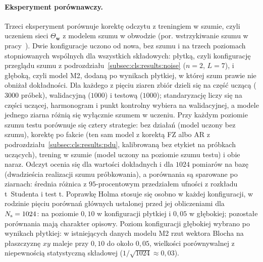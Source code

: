 \paragraph{Eksperyment porównawczy.}
Trzeci eksperyment porównuje korektę odczytu z treningiem w szumie, czyli uczeniem sieci $\Theta_{\mathbf{w}}$ z modelem szumu w obwodzie (por. wstrzykiwanie szumu w pracy~\cite{wang_quantumnat_2022}).
Dwie konfiguracje uczono od nowa, bez szumu i na trzech poziomach stopniowanych wspólnych dla wszystkich składowych: płytką, czyli konfigurację przeglądu szumu z podrozdziału~\ref{subsec:cls:results:noise} ($n=2$, $L=7$), i głęboką, czyli model M2, dodaną po wynikach płytkiej, w której szum prawie nie obniżał dokładności.
Dla każdego z pięciu ziaren zbiór dzieli się na część uczącą ($3000$ próbek), walidacyjną ($1000$) i testową ($1000$); standaryzację liczy się na części uczącej, harmonogram i punkt kontrolny wybiera na walidacyjnej, a modele jednego ziarna różnią się wyłącznie szumem w uczeniu.
Przy każdym poziomie szumu testu porównuje się cztery strategie: bez działań (model uczony bez szumu), korektę po fakcie (ten sam model z korektą FZ albo AR z podrozdziału~\ref{subsec:cls:results:pdu}, kalibrowaną bez etykiet na próbkach uczących), trening w szumie (model uczony na poziomie szumu testu) i obie naraz.
Odczyt ocenia się dla wartości dokładnych i dla $1024$ pomiarów na bazę (dwadzieścia realizacji szumu próbkowania), a porównania są sparowane po ziarnach: średnia różnica z $95$-procentowym przedziałem ufności z rozkładu t~Studenta i test t.
Poprawkę Holma stosuje się osobno w każdej konfiguracji, w rodzinie pięciu porównań głównych ustalonej przed jej obliczeniami dla $N_{\mathrm{s}}=1024$: na poziomie $0{,}10$ w konfiguracji płytkiej i $0{,}05$ w głębokiej; pozostałe porównania mają charakter opisowy.
Poziom konfiguracji głębokiej wybrano po wynikach płytkiej: w istniejących danych modelu M2 rzut wektora Blocha na płaszczyznę $xy$ maleje przy $0{,}10$ do około $0{,}05$, wielkości porównywalnej z niepewnością statystyczną składowej ($1/\sqrt{1024}\approx0{,}03$).
